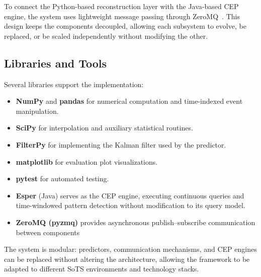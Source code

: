 To connect the Python-based reconstruction layer with the Java-based CEP engine, the system uses lightweight message passing through ZeroMQ~\cite{zeromq_org}. This design keeps the components decoupled, allowing each subsystem to evolve, be replaced, or be scaled independently without modifying the other.


\subsection{Libraries and Tools}
Several libraries support the implementation:

\begin{itemize}
    \item \textbf{NumPy} and \textbf{pandas} for numerical computation and time-indexed event manipulation.
    \item \textbf{SciPy} for interpolation and auxiliary statistical routines.
    \item \textbf{FilterPy} for implementing the Kalman filter used by the predictor.
    \item \textbf{matplotlib} for evaluation plot visualizations.
    \item \textbf{pytest} for automated testing.
    \item \textbf{Esper} (Java) serves as the CEP engine, executing continuous queries and time-windowed pattern detection without modification to its query model.
    \item \textbf{ZeroMQ (pyzmq)} provides asynchronous publish–subscribe communication between components
\end{itemize}

The system is modular: predictors, communication mechanisms, and CEP engines can be replaced without altering the architecture, allowing the framework to be adapted to different SoTS environments and technology stacks.
